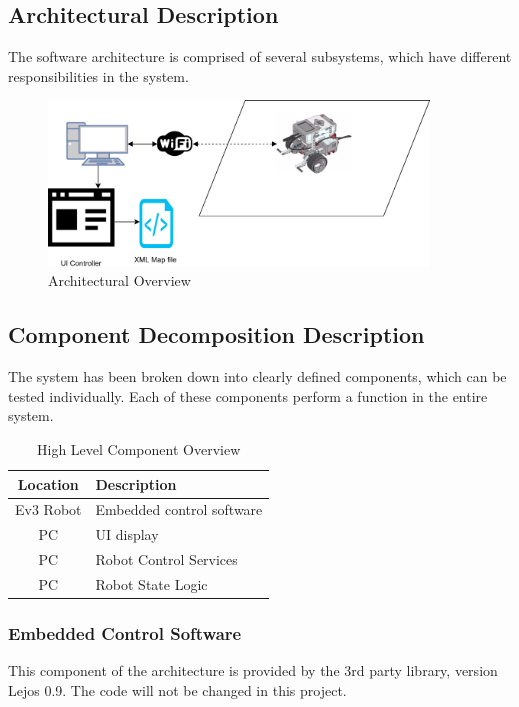 \subsection{Architectural Description}
The software architecture is comprised of several subsystems, which have different responsibilities in the system.

\begin{figure}[H]
	\centering
	\includegraphics[width=0.9\textwidth]{Robot_system.png}
	\caption{\label{fig:robotSystem} Architectural Overview}
\end{figure}

\subsection{Component Decomposition Description}
The system has been broken down into clearly defined components, which can be tested individually. Each of these components perform a function in the entire system.

\begin{table}[H]
\centering
\begin{tabular}{|c|l|}
	\hline
	\bf{Location} & \bf{Description} \\
	\hline
	\hline
	Ev3 Robot & Embedded control software \\
	\hline
	PC & UI display \\
	\hline
	PC & Robot Control Services \\
	\hline
	PC & Robot State Logic \\
	\hline
\end{tabular}
\caption{\label{fig:compHigh}High Level Component Overview}
\end{table}

\subsubsection*{Embedded Control Software}
This component of the architecture is provided by the 3rd party library, version Lejos 0.9. The code will not be changed in this project.

